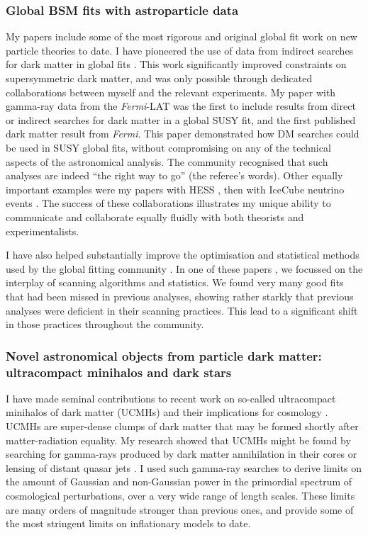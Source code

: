 \documentclass[a4paper,11pt]{article}
\begin{document}
\subsubsection{Global BSM fits with astroparticle data}
My papers include some of the most rigorous and original global fit work on new particle theories to date.  I have pioneered the use of data from indirect searches for dark matter in global fits \cite{Scott09c, Ripken11, IC22Methods, Silverwood12, Cline13, Cline13b}.  This work significantly improved constraints on supersymmetric dark matter, and was only possible through dedicated collaborations between myself and the relevant experiments.  My paper with gamma-ray data from the \textit{Fermi}-LAT \cite{Scott09c} was the first to include results from direct or indirect searches for dark matter in a global SUSY fit, and the first published dark matter result from \textit{Fermi}.  This paper demonstrated how DM searches could be used in SUSY global fits, without compromising on any of the technical aspects of the astronomical analysis.  The community recognised that such analyses are indeed ``the right way to go'' (the referee's words).  Other equally important examples were my papers with HESS \cite{Ripken11}, then with IceCube neutrino events \cite{IC22Methods, Silverwood12}.  The success of these collaborations illustrates my unique ability to communicate and collaborate equally fluidly with both theorists and experimentalists.

I have also helped substantially improve the optimisation and statistical methods used by the global fitting community \cite{Akrami09, Akrami11coverage, Akrami11DD, Strege12, pippi}.  In one of these papers \cite{Akrami09}, we focussed on the interplay of scanning algorithms and statistics.  We found very many good fits that had been missed in previous analyses, showing rather starkly that previous analyses were deficient in their scanning practices.  This lead to a significant shift in those practices throughout the community.

\subsubsection{Novel astronomical objects from particle dark matter: ultracompact minihalos and dark stars}
I have made seminal contributions to recent work on so-called ultracompact minihalos of dark matter (UCMHs) and their implications for cosmology \cite{SS09, Bringmann11, Shandera12, Zackrisson12}.  UCMHs are super-dense clumps of dark matter that may be formed shortly after matter-radiation equality.  My research showed that UCMHs might be found by searching for gamma-rays produced by dark matter annihilation in their cores \cite{SS09} or lensing of distant quasar jets \cite{Zackrisson12}.  I used such gamma-ray searches to derive limits on the amount of Gaussian \cite{Bringmann11} and non-Gaussian \cite{Shandera12} power in the primordial spectrum of cosmological perturbations, over a very wide range of length scales.  These limits are many orders of magnitude stronger than previous ones, and provide some of the most stringent limits on inflationary models to date.
\end{document}
